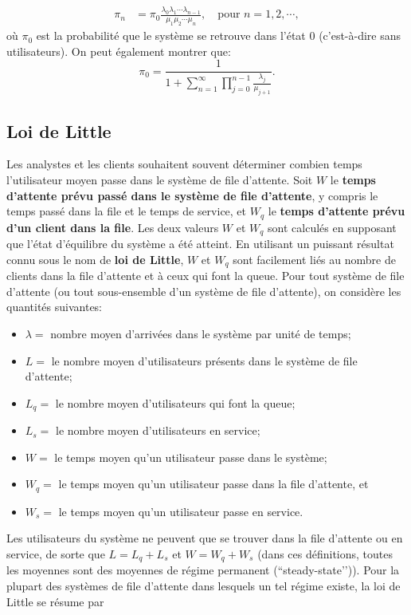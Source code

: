 \begin{align} \pi_{n} &= \pi_{0}\frac{\lambda_{0} \lambda_{1} \cdots \lambda_{n-1}}{\mu_{1} \mu_{2} \cdots \mu_{n}},\quad  \text{pour    } n=1,2,\cdots,\label{eq:ssbr}
\end{align}
où $\pi_{0}$ est la probabilité que le système se retrouve dans l'état 0 (c’est-à-dire sans utilisateurs). On peut également montrer \cite{QS_K1} que:
$$ \pi_{0} = \frac{1}{1+ \sum^{\infty}_{n=1} \prod^{n-1}_{j=0} \frac{\lambda_{j}}{\mu_{j+1}}}.$$ 

\subsection{Loi de Little}
Les analystes et les clients souhaitent souvent déterminer combien temps l'utilisateur moyen passe dans le système de file d'attente. Soit $W$ le \textbf{temps d'attente prévu passé dans le système de file d’attente}, y compris le temps passé dans la file et le temps de service, et $W_{q}$ le \textbf{temps d'attente prévu d'un client dans la file}. Les deux valeurs $W$ et $W_{q}$ sont calculés en supposant que l'état d'équilibre du système a été atteint. En utilisant un puissant résultat connu sous le nom de \textbf{loi de Little}, $W$ et $W_{q}$ sont facilement liés au nombre de clients dans la file d'attente et à ceux qui font la queue. \newl  Pour tout système de file d'attente (ou tout sous-ensemble d'un système de file d'attente), on considère les quantités suivantes:
\begin{itemize}[noitemsep]
\item $\lambda = $  nombre moyen d'arrivées dans le système par unité de temps;  
\item $L =$  le nombre moyen d'utilisateurs présents dans le système de file d'attente;
\item $L_{q} = $  le nombre moyen d'utilisateurs qui font la queue;
\item $L_{s} = $  le nombre moyen d'utilisateurs en service;
\item $W = $  le temps moyen qu'un utilisateur passe dans le système;
\item $W_{q} = $  le temps moyen qu'un utilisateur passe dans la file d'attente, et
\item $W_{s} = $  le temps moyen qu'un utilisateur passe en service.
\end{itemize}
Les utilisateurs du système ne peuvent que se trouver dans la file d'attente ou en service, de sorte que $L = L_{q} + L_{s}$ et $W = W_{q} + W_{s}$ (dans ces définitions, toutes les moyennes sont des moyennes de régime permanent (``steady-state’’)). Pour la plupart des systèmes de file d'attente dans lesquels un tel régime existe, la loi de Little se résume par 
